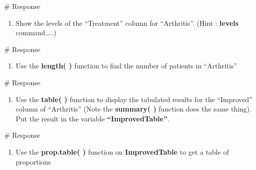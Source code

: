 \documentclass[
  letterpaper,
  DIV=11,
  numbers=noendperiod]{scrreprt}
\newenvironment{Shaded}{\begin{snugshade}}{\end{snugshade}}
\newcommand{\CommentTok}[1]{\textcolor[rgb]{0.37,0.37,0.37}{#1}}
\providecommand{\tightlist}{%
  \setlength{\itemsep}{0pt}\setlength{\parskip}{0pt}}\usepackage{longtable,booktabs,array}
\begin{document}
\begin{Shaded}
\begin{Highlighting}[]
\CommentTok{\# Response}
\end{Highlighting}
\end{Shaded}

\begin{enumerate}
\def\labelenumi{\arabic{enumi}.}
\setcounter{enumi}{8}
\tightlist
\item
  Show the levels of the ``Treatment'' column for ``Arthritis''. (Hint :
  \textbf{levels} command\ldots..)
\end{enumerate}

\begin{Shaded}
\begin{Highlighting}[]
\CommentTok{\# Response}
\end{Highlighting}
\end{Shaded}

\begin{enumerate}
\def\labelenumi{\arabic{enumi}.}
\setcounter{enumi}{9}
\tightlist
\item
  Use the \textbf{length( )} function to find the number of patients in
  ``Arthritis''
\end{enumerate}

\begin{Shaded}
\begin{Highlighting}[]
\CommentTok{\# Response}
\end{Highlighting}
\end{Shaded}

\begin{enumerate}
\def\labelenumi{\arabic{enumi}.}
\setcounter{enumi}{10}
\tightlist
\item
  Use the \textbf{table( )} function to display the tabulated results
  for the ``Improved'' column of ``Arthritis'' (Note the
  \textbf{summary( )} function does the same thing). Put the result in
  the variable \textbf{``ImprovedTable''}.
\end{enumerate}

\begin{Shaded}
\begin{Highlighting}[]
\CommentTok{\# Response}
\end{Highlighting}
\end{Shaded}

\begin{enumerate}
\def\labelenumi{\arabic{enumi}.}
\setcounter{enumi}{11}
\tightlist
\item
  Use the \textbf{prop.table( )} function on \textbf{ImprovedTable} to
  get a table of proportions
\end{enumerate}
\end{document}

